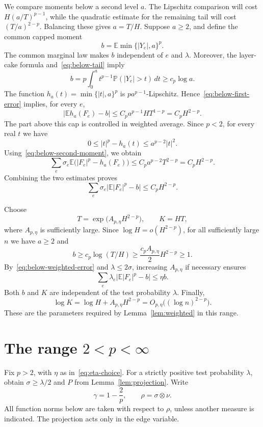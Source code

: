 \documentclass[11pt]{article}
\newcommand{\E}{\mathbb E}
\newcommand{\Prob}{\mathbb P}
\theoremstyle{remark}
\numberwithin{equation}{section}
\begin{document}
We compare moments below a second level $a$. The Lipschitz comparison
will cost $H(a/T)^{p-1}$, while the quadratic estimate for the remaining
tail will cost $(T/a)^{2-p}$. Balancing these gives $a=T/H$.
Suppose $a\ge2$, and define the common capped moment
\[
 b=\E\min\{|Y_e|,a\}^p.
\]
The common marginal law makes $b$ independent of $e$ and $\lambda$.
Moreover, the layer-cake formula and~\eqref{eq:below-tail} imply
\begin{equation}\label{eq:below-b}
 b=p\int_0^a t^{p-1}\Prob(|Y_e|>t)\,dt
 \ge c_p\log a.
\end{equation}
The function $h_a(t)=\min\{|t|,a\}^p$ is $pa^{p-1}$-Lipschitz.
Hence~\eqref{eq:below-first-error} implies, for every $e$,
\[
 \bigl|\E h_a(F_e)-b\bigr|
 \le C_p a^{p-1}HT^{1-p}
 =C_p H^{2-p}.
\]
The part above this cap is controlled in weighted average. Since
$p<2$, for every real $t$ we have
\[
 0\le |t|^p-h_a(t)\le a^{p-2}|t|^2.
\]
Using~\eqref{eq:below-second-moment}, we obtain
\[
 \sum_e\sigma_e\E\bigl(|F_e|^p-h_a(F_e)\bigr)
 \le C_p a^{p-2}T^{2-p}
 =C_p H^{2-p}.
\]
Combining the two estimates proves
\begin{equation}\label{eq:below-weighted-error}
 \sum_e\sigma_e\bigl|\E|F_e|^p-b\bigr|
 \le C_p H^{2-p}.
\end{equation}

Choose
\[
 T=\exp\bigl(A_{p,\eta}H^{2-p}\bigr),
 \qquad K=HT,
\]
where $A_{p,\eta}$ is sufficiently large. Since
$\log H=o(H^{2-p})$, for all sufficiently large $n$ we have
$a\ge2$ and
\[
 b\ge c_p\log(T/H)
 \ge\frac{c_pA_{p,\eta}}2 H^{2-p}\ge1.
\]
By~\eqref{eq:below-weighted-error} and $\lambda\le2\sigma$, increasing
$A_{p,\eta}$ if necessary ensures
\[
 \sum_e\lambda_e\bigl|\E|F_e|^p-b\bigr|\le\eta b.
\]
Both $b$ and $K$ are independent of the test probability $\lambda$.
Finally,
\[
 \log K=\log H+A_{p,\eta}H^{2-p}
 =O_{p,\eta}\bigl((\log n)^{2-p}\bigr).
\]
These are the parameters required by Lemma~\ref{lem:weighted} in this range.

\section{The range \texorpdfstring{$2<p<\infty$}{2 < p < infinity}}
\label{sec:above}

Fix $p>2$, with $\eta$ as in~\eqref{eq:eta-choice}. For a strictly
positive test probability $\lambda$, obtain $\sigma\ge\lambda/2$ and
$P$ from Lemma~\ref{lem:projection}. Write
\[
 \gamma=1-\frac2p,\qquad \rho=\sigma\otimes\nu.
\]
All function norms below are taken with respect to $\rho$, unless another
measure is indicated. The projection acts only in the edge variable.
\end{document}
